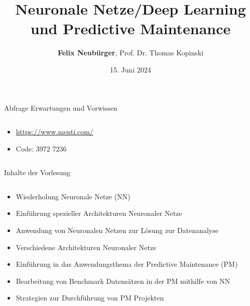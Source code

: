 \documentclass[aspectratio=1610, xcolor=dvipsnames, 9pt]{beamer}
\title{Neuronale Netze/Deep Learning und Predictive Maintenance}
\author[F.~Neubürger, T.~Kopinski]{ \textbf{Felix Neubürger}, Prof. Dr. Thomas Kopinski}
\institute[I \& W]{Fachhochschule Südwestfalen, Ingenieurs- \& Wirtschaftswissenschaften}
\date{15. Juni 2024}
\begin{document}
\maketitle
\begin{frame}{Abfrage Erwartungen und Vorwissen}
  \begin{columns}
    \begin{column}{1\textwidth}
      \begin{itemize}
        \item \url{https://www.menti.com/} \newline
        \item Code: 3972 7236
      \end{itemize}
    \end{column}
    \begin{column}{0\textwidth}
    \end{column}
  \end{columns}
\end{frame}

\begin{frame}{Inhalte der Vorlesung}
  \begin{columns}
    \begin{column}{1\textwidth}
      \begin{itemize}
        \item Wiederholung Neuronale Netze (NN)\newline
        \item Einführung spezieller Architekturen Neuronaler Netze \newline
        \item Anwendung von Neuronalen Netzen zur Lösung zur Datenanalyse  \newline
        \item Verschiedene Architekturen Neuronaler Netze \newline 
        \item Einführung in das Anwendungsthema der Predictive Maintenance (PM) \newline
        \item Bearbeitung von Benchmark Datensätzen in der PM mithilfe von NN \newline
        \item Strategien zur Durchführung von PM Projekten
      \end{itemize}
    \end{column}
    \begin{column}{0\textwidth}
    \end{column}
  \end{columns}
\end{frame}
\end{document}
